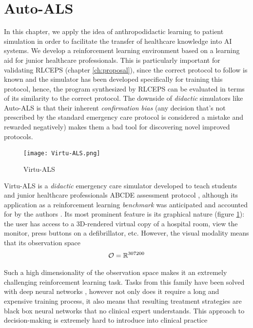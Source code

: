 \newpage
\section{Auto-ALS}
\label{sec:auto-als}


In this chapter, we apply the idea of anthropodidactic learning to patient simulation in order to facilitate the transfer of healthcare knowledge into AI systems.
We develop a reinforcement learning environment based on a learning aid for junior healthcare professionals.
This is particularly important for validating RLCEPS (chapter \ref{ch:proposal}), since the correct protocol to follow is known and the simulator has been developed specifically for training this protocol, hence, the program synthesized by RLCEPS can be evaluated in terms of its similarity to the correct protocol.
The downside of \emph{didactic} simulators like Auto-ALS is that their inherent \emph{confirmation bias} (any decision that's not prescribed by the standard emergency care protocol is considered a mistake and rewarded negatively) makes them a bad tool for discovering novel improved protocols.

\begin{figure}
    \centering
    \texttt{[image: Virtu-ALS.png]}
    \caption{Virtu-ALS}
    \label{fig:virtu-als}
\end{figure}

Virtu-ALS is a \emph{didactic} emergency care simulator developed to teach students and junior healthcare professionals ABCDE assessment protocol \cite{thimInitialAssessmentTreatment2012}, although its application as a reinforcement learning \emph{benchmark} was anticipated and accounted for by the authors \cite{briskAIEnhanceInteractive2018}.
Its most prominent feature is its graphical nature (figure \ref{fig:virtu-als}): the user has access to a 3D-rendered virtual copy of a hospital room, view the monitor, press buttons on a defibrillator, etc.
However, the visual modality means that its observation space 
\begin{equation}
    \mathcal{O} = \mathbb{R}^{307200}
\end{equation}

Such a high dimensionality of the observation space makes it an extremely challenging reinforcement learning task.
Tasks from this family have been solved with deep neural networks \cite{mnihPlayingAtariDeep2013}, however not only does it require a long and expensive training process, it also means that resulting treatment strategies are black box neural networks that no clinical expert understands.
This approach to decision-making is extremely hard to introduce into clinical practice \cite{priceBigDataBlackbox2018,watsonClinicalApplicationsMachine2019}


